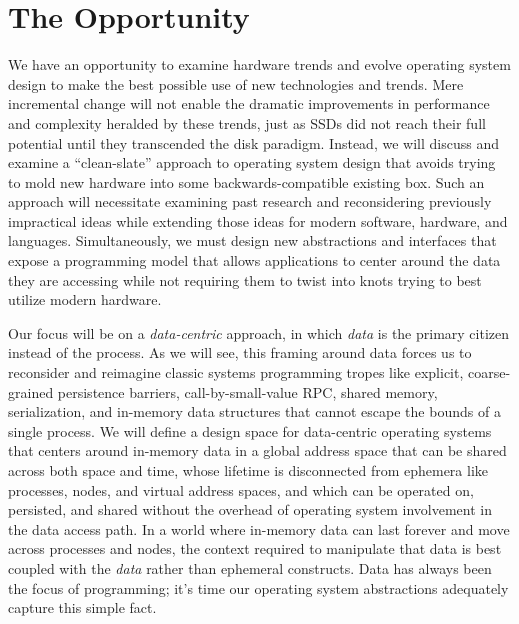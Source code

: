 \section*{The Opportunity}


We have an opportunity to examine hardware trends and evolve operating system design to make the best possible use of
new technologies and trends. Mere incremental change will not enable the dramatic improvements in performance and
complexity heralded by these trends, just as SSDs did not reach their full potential
until they transcended the disk paradigm. Instead, we will discuss and examine a ``clean-slate'' approach to
operating system design that avoids trying to mold new hardware into some backwards-compatible existing
box. Such an
approach will necessitate examining past research and reconsidering previously impractical ideas while extending those
ideas for modern software, hardware, and languages. Simultaneously, we must design new abstractions and interfaces that
expose a programming model that allows applications to center around the data they are accessing while not requiring
them to twist into knots trying to best utilize modern hardware.

Our focus will be on a \emph{data-centric} approach, in which \emph{data} is the primary citizen instead of the process.
As we will see, this framing around data forces us to reconsider and reimagine classic systems programming tropes like
explicit, coarse-grained persistence barriers, call-by-small-value RPC, shared memory, serialization, and in-memory data structures
that cannot escape the bounds of a single process. We will define a design space for data-centric operating systems that
centers around in-memory data in a global address space that can be shared across both space and time, whose lifetime
is disconnected from ephemera like processes, nodes, and virtual address spaces, and which can be operated on,
persisted, and shared without the overhead of operating system involvement in the data access
path.
In a world where in-memory data can last forever and move across processes and nodes, the context required to manipulate
that data is best coupled with the \emph{data} rather than ephemeral constructs.
Data has always been the focus of programming; it's time our operating system abstractions adequately capture this
simple fact.


